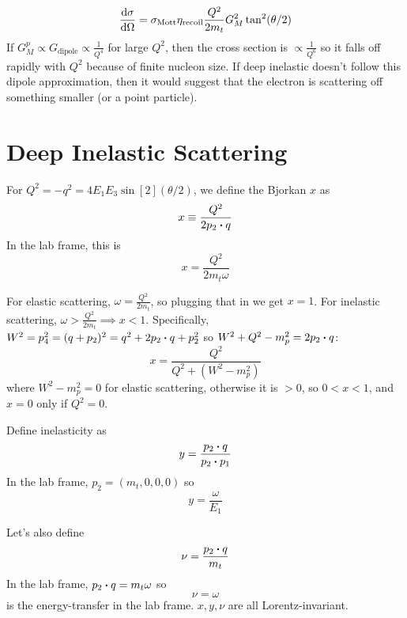 \documentclass[a4paper,twoside,master.tex]{subfiles}
\begin{document}
\begin{equation}
    \dv{\sigma}{\Omega} = \sigma_{\text{Mott}} \eta_{\text{recoil}} \frac{Q^2}{2m_t} G_M^2 \tan[2](\theta / 2)
\end{equation}
If $ G_M^p \propto G_{\text{dipole}} \propto \frac{1}{Q^4} $ for large $ Q^2 $, then the cross section is $ \propto \frac{1}{Q^6} $ so it falls off rapidly with $ Q^2 $ because of finite nucleon size. If deep inelastic doesn't follow this dipole approximation, then it would suggest that the electron is scattering off something smaller (or a point particle).

\section{Deep Inelastic Scattering}\label{sec:deep_inelastic_scattering}

For $ Q^2 = - q^2 = 4 E_1 E_3 \sin[2](\theta / 2) $, we define the Bjorkan $ x $ as
\begin{equation}
    x \equiv \frac{Q^2}{2 p_2 \vdot q}
\end{equation}
In the lab frame, this is 
\begin{equation}
    x = \frac{Q^2}{2m_t \omega}
\end{equation}

For elastic scattering, $ \omega = \frac{Q^2}{2m_t} $, so plugging that in we get $ x = 1 $. For inelastic scattering, $ \omega > \frac{Q^2}{2m_t} \implies x < 1 $. Specifically, $ W^2 = p_4^2 = (q + p_2)^2 = q^2 + 2 p_2 \vdot q + p_2^2 $ so $ W^2 + Q^2 - m_p^2 = 2 p_2 \vdot q $:
\begin{equation}
    x = \frac{Q^2}{Q^2 + (W^2 - m_p^2)} 
\end{equation}
where $ W^2 - m_p^2 = 0 $ for elastic scattering, otherwise it is $ > 0 $, so $ 0 < x < 1 $, and $ x = 0 $ only if $ Q^2 = 0 $. 

Define inelasticity as
\begin{equation}
    y = \frac{p_2 \vdot q}{p_2 \vdot p_1}
\end{equation}
In the lab frame, $ p_2 = (m_t, 0, 0, 0) $ so
\begin{equation}
    y = \frac{\omega}{E_1} 
\end{equation}

Let's also define
\begin{equation}
    \nu = \frac{p_2 \vdot q}{m_t} 
\end{equation}
In the lab frame, $ p_2 \vdot q = m_t \omega $ so
\begin{equation}
    \nu = \omega
\end{equation}
is the energy-transfer in the lab frame. $ x, y, \nu $ are all Lorentz-invariant.
\end{document}
